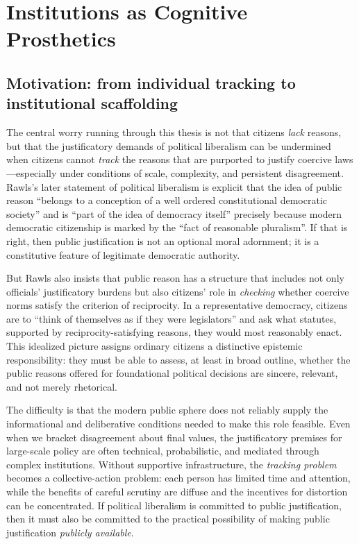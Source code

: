 \documentclass[12pt]{report}
\begin{document}
\chapter{Institutions as Cognitive Prosthetics}

\section{Motivation: from individual tracking to institutional scaffolding}

The central worry running through this thesis is not that citizens \emph{lack} reasons, but that the justificatory demands of political liberalism can be undermined when citizens cannot \emph{track} the reasons that are purported to justify coercive laws---especially under conditions of scale, complexity, and persistent disagreement.
Rawls’s later statement of political liberalism is explicit that the idea of public reason \enquote{belongs to a conception of a well ordered constitutional democratic society} and is \enquote{part of the idea of democracy itself} precisely because modern democratic citizenship is marked by the \enquote{fact of reasonable pluralism}. \parencite[p.~765]{rawls1997public}
If that is right, then public justification is not an optional moral adornment; it is a constitutive feature of legitimate democratic authority.

But Rawls also insists that public reason has a structure that includes not only officials’ justificatory burdens but also citizens’ role in \emph{checking} whether coercive norms satisfy the criterion of reciprocity. \parencite[p.~767]{rawls1997public}
In a representative democracy, citizens are to \enquote{think of themselves as if they were legislators} and ask what statutes, supported by reciprocity-satisfying reasons, they would most reasonably enact. \parencite[p.~769]{rawls1997public}
This idealized picture assigns ordinary citizens a distinctive epistemic responsibility: they must be able to assess, at least in broad outline, whether the public reasons offered for foundational political decisions are sincere, relevant, and not merely rhetorical.

The difficulty is that the modern public sphere does not reliably supply the informational and deliberative conditions needed to make this role feasible. 
Even when we bracket disagreement about final values, the justificatory premises for large-scale policy are often technical, probabilistic, and mediated through complex institutions.
Without supportive infrastructure, the \emph{tracking problem} becomes a collective-action problem: each person has limited time and attention, while the benefits of careful scrutiny are diffuse and the incentives for distortion can be concentrated.
If political liberalism is committed to public justification, then it must also be committed to the practical possibility of making public justification \emph{publicly available}.
\end{document}
